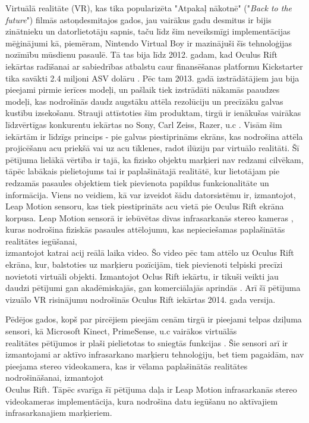 \documentclass[12pt, a4paper, oneside, openright]{article}
\begin{document}
\par
Virtuālā realitāte (VR), kas tika popularizēta "Atpakaļ nākotnē" ("\textit{Back to the future}") filmās 
astoņdesmitajos gados, jau vairākus gadu desmitus ir bijis zinātnieku un datorlietotāju sapnis, 
taču līdz šim neveiksmīgi implementācijas mēģinājumi kā, piemēram, Nintendo Virtual Boy ir 
mazinājuši šīs tehnoloģijas nozīmību mūsdienu pasaulē. 
Tā tas bija līdz 2012. gadam, kad Oculus Rift iekārtas radīšanai ar sabiedrības atbalstu caur 
finansēšanas platformu Kickstarter tika savākti 2.4 miljoni ASV dolāru \cite{olivier_bau_revel:_2013}. 
Pēc tam 2013. gadā izstrādātājiem jau bija pieejami pirmie ierīces modeļi, un pašlaik 
tiek izstrādāti nākamās paaudzes modeļi, kas nodrošinās daudz augstāku attēla rezolūciju un 
precīzāku galvas kustību izsekošanu. Strauji attīstoties šim produktam, tirgū ir ienākušas vairākas 
līdzvērtīgas konkurentu iekārtas no Sony, Carl Zeiss, Razer, u.c \cite{olivier_bau_revel:_2013}. 
Visām šim iekārtām ir līdzīgs princips - pie galvas 
piestiprināms ekrāns, kas nodrošina attēla projicēšanu acu priekšā vai uz acu tīklenes, radot ilūziju par virtuālo realitāti.
%
Šī pētījuma lielākā vērtība ir tajā, ka fizisko objektu marķieri nav redzami cilvēkam, tāpēc
labākais pielietojums tai ir paplašinātajā realitātē, kur lietotājam pie redzamās pasaules objektiem tiek
pievienota papildus funkcionalitāte un informācija.
Viens no veidiem, kā var izveidot šādu datorsistēmu ir, izmantojot, Leap Motion sensoru, 
kas tiek piestiprināts acu vietā pie Oculus Rift ekrāna korpusa. 
Leap Motion sensorā ir iebūvētas divas infrasarkanās stereo kameras \cite{JozeGuna2014}, kuras nodrošina
fiziskās pasaules attēlojumu, kas nepieciešamas paplašinātās realitātes iegūšanai, \\
izmantojot katrai acij reālā laika video. 
Šo video pēc tam attēlo uz Oculus Rift ekrāna, kur, balstoties uz marķieru pozīcijām, 
tiek pievienoti telpiski precīzi novietoti virtuāli objekti.
%
Izmantojot Oclus Rift iekārtu, ir tikuši veikti jau daudzi pētījumi gan akadēmiskajās, 
gan komerciālajās aprindās 
\cite{mark_bolas_open_2013} 
\cite{oliver_kreylos_eye-tracked_2014}. 
Arī šī pētījuma vizuālo VR risinājumu nodrošinās Oculus Rift iekārtas 2014. gada versija.
\par
Pēdējos gados, kopš par pircējiem pieejām cenām tirgū ir pieejami telpas dziļuma sensori, kā 
Microsoft Kinect, PrimeSense, u.c vairākos virtuālās \\ realitātes pētījumos ir plaši pielietotas 
to sniegtās funkcijas 
\cite{whelan_kintinuous:_2012} 
\cite{richard_a._newcombe_kinectfusion:_2011} 
\cite{andrea_colaco_mime:_2013}. 
Šie sensori arī ir izmantojami ar aktīvo infrasarkano marķieru tehnoloģiju, bet tiem
pagaidām, nav pieejama stereo videokamera, kas ir vēlama paplašinātās realitātes nodrošināšanai,
izmantojot \\ Oculus Rift.
Tāpēc svarīga šī pētījuma daļa ir Leap Motion infrasarkanās stereo videokameras implementācija, 
kura nodrošina datu iegūšanu no aktīvajiem infrasarkanajiem marķieriem. 
\end{document}
